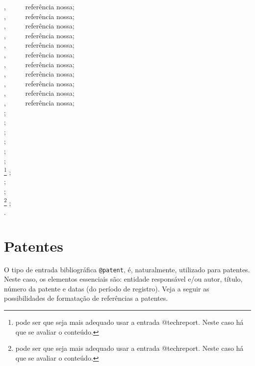 \begin{apendicesenv}
{\small
    \cite{abnTeX22014b}  , \ \ \ \ \ referência nossa;\\
    \cite{abnTeX22014c}  , \ \ \ \ \ referência nossa;\\
    \cite{abnTeX22014d}  , \ \ \ \ \ referência nossa;\\
    \cite{NBR6023:2002}  , \ \ \ \ \ referência nossa;\\
    \cite{NBR6022:2003}  , \ \ \ \ \ referência nossa;\\
    \cite{NBR6024:2003}  , \ \ \ \ \ referência nossa;\\
    \cite{NBR6027:2003}  , \ \ \ \ \ referência nossa;\\
    \cite{NBR10520:2002}  , \ \ \ \ \ referência nossa;\\
    \cite{NBR15287:2005}  , \ \ \ \ \ referência nossa;\\
    \cite{NBR6029:2006}  , \ \ \ \ \ referência nossa;\\
    \cite{NBR14724:2011}  , \ \ \ \ \ referência nossa;\\
    \cite{francco1996}  ;\\
    \cite{geografico1986}  ;\\
    \cite{geografico1994}  ;\\
    \cite{moreira1997}  ;\\
    \cite{museu1997}  ;\\
    \cite{resprinb1997}  ;\\
    \cite{secretaria1989}\footnote{pode ser que seja mais adequado usar a entrada {\ttfamily @techreport}. Neste caso há que se avaliar o conteúdo.} ;\\
    \cite{secretaria1993}  ;\\
    \cite{universidade1993} ;\\
    \cite{justica1993}\footnote{pode ser que seja mais adequado usar a entrada {\ttfamily @techreport}. Neste caso há que se avaliar o conteúdo.} ;\\
    \cite{vicosa1994} .\\
}



\section{Patentes}
\label{sec:patent}

O tipo de entrada bibliográfica \verb|@patent|, é, naturalmente, utilizado para patentes. Neste caso, os elementos essenciais são: entidade responsável e/ou autor, título, número da patente e datas (do período de registro). Veja a seguir as possibilidades de formatação de referências a patentes.


\end{apendicesenv}
